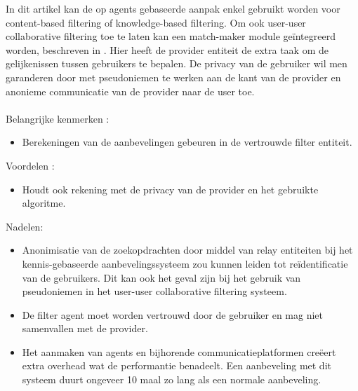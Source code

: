 In dit artikel kan de op agents gebaseerde aanpak enkel gebruikt worden voor content-based filtering of knowledge-based filtering. Om ook user-user collaborative filtering toe te laten kan  een match-maker module ge\"integreerd worden, beschreven in \cite{CisseeThesis2009}. Hier heeft de provider entiteit de extra taak om de gelijkenissen tussen gebruikers te bepalen. De privacy van de gebruiker wil men garanderen door met pseudoniemen te werken aan de kant van de provider en anonieme communicatie van de provider naar de user toe.\\\\
Belangrijke kenmerken : 
\begin{itemize}


\item Berekeningen van de aanbevelingen gebeuren in de vertrouwde filter entiteit.
\end{itemize}
Voordelen : 
\begin{itemize}


\item Houdt ook rekening met de privacy van de provider en het gebruikte algoritme.

\end{itemize}
Nadelen:
\begin{itemize}
\item Anonimisatie van de zoekopdrachten door middel van relay entiteiten bij het kennis-gebaseerde aanbevelingssysteem zou kunnen leiden tot re\"identificatie van de gebruikers. Dit kan ook het geval zijn bij het gebruik van pseudoniemen in het user-user collaborative filtering systeem.
\item De filter agent moet worden vertrouwd door de gebruiker en mag niet samenvallen met de provider.
\item Het aanmaken van agents en bijhorende communicatieplatformen cre\" eert extra overhead wat de performantie benadeelt. Een aanbeveling met dit systeem duurt ongeveer 10 maal zo lang als een normale aanbeveling.

\end{itemize}